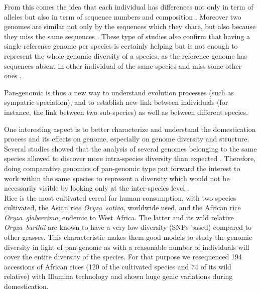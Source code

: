 \documentclass[10pt,letterpaper]{article}
\begin{document}
From this comes the idea that each individual has differences not only in term of alleles but also in term of sequence numbers and composition \cite{Chia2012, Hennig2015, Lu2015}. Moreover two genomes are similar not only by the sequences which they share, but also because they miss the same sequences \cite{Snipen2010}. These type of studies also confirm that having a single reference genome per species is certainly helping but is not enough to represent the whole genomic diversity of a species, as the reference genome has sequences absent in other individual of the same species and miss some other ones \cite{Weigel2009, Gan2011, Upadhyaya2015}. 

Pan-genomic is thus a new way to understand evolution processes (such as sympatric speciation), and to establish new link between individuals (for instance, the link between two sub-species) as well as between different species. 

One interesting aspect is to better characterize and understand the domestication process and its effects on genome, especially on genome diversity and structure.\\

Several studies showed that the analysis of several genomes belonging to the same species allowed to discover more intra-species diversity than expected \cite{Tettelin2008}. Therefore, doing comparative genomics of pan-genomic type put forward the interest to work within the same species to represent a diversity which would not be necessarily visible by looking only at the inter-species level \cite{Lukjancenko2012}. \\

Rice is the most cultivated cereal for human consumption, with two species cultivated, the Asian rice \emph{Oryza~sativa}, worldwide used, and the African rice \emph{Oryza~glaberrima}, endemic to West
Africa. The latter and its wild relative \emph{Oryza~barthii} are known to have a very low diversity (SNPs based)\cite{Nabholz2014a} compared to other grasses. This characteristic makes them good models to study the genomic diversity in light of pan-genome as with a reasonable number of individuals will cover the entire diversity of the species. For that purpose we resequenced 194 accessions of African rices (120 of the cultivated species and 74 of its wild relative) with Illumina technology and shown huge genic variations during domestication.\\
\end{document}
